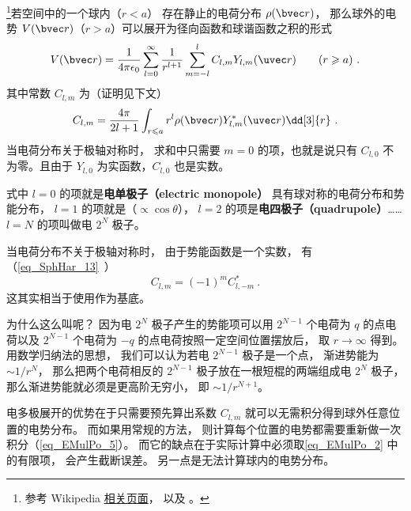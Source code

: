 

\footnote{参考 Wikipedia \href{https://en.wikipedia.org/wiki/Multipole_expansion}{相关页面}， 以及 \cite{Jackson}。}若空间中的一个球内（$r < a$） 存在静止的电荷分布 $\rho(\bvec r)$， 那么球外的电势 $V(\bvec r)$（$r > a$）可以展开为径向函数和球谐函数之积的形式
\begin{equation}\label{eq_EMulPo_2}
V(\bvec r) = \frac{1}{4\pi\epsilon_0}\sum_{l = 0}^\infty \frac{1}{r^{l+1}}\sum_{m = -l}^l C_{l,m} Y_{l,m}(\uvec r) \qquad (r \geqslant a)~.
\end{equation}
其中常数 $C_{l,m}$ 为（证明见下文）
\begin{equation}\label{eq_EMulPo_7}
C_{l,m} = \frac{4\pi}{2l+1} \int_{r\leqslant a} r^l \rho(\bvec r) Y_{l,m}^*(\uvec r) \dd[3]{r}~.
\end{equation}
当电荷分布关于极轴对称时， 求和中只需要 $m=0$ 的项，也就是说只有 $C_{l,0}$ 不为零。且由于 $Y_{l,0}$ 为实函数，$C_{l,0}$ 也是实数。

式中 $l = 0$ 的项就是\textbf{电单极子（electric monopole）} 具有球对称的电荷分布和势能分布， $l = 1$ 的项就是（$\propto\cos \theta$）， $l = 2$ 的项是\textbf{电四极子（quadrupole）}……  $l = N$ 的项叫做电 $2^N$ 极子。

当电荷分布不关于极轴对称时， 由于势能函数是一个实数， 有（\autoref{eq_SphHar_13}~）
\begin{equation}
C_{l,m} = (-1)^m C_{l,-m}^*~.
\end{equation}
这其实相当于使用作为基底。

为什么这么叫呢？ 因为电 $2^N$ 极子产生的势能项可以用 $2^{N-1}$ 个电荷为 $q$ 的点电荷以及 $2^{N-1}$ 个电荷为 $-q$ 的点电荷按照一定空间位置摆放后， 取 $r \to \infty$ 得到。 用数学归纳法的思想， 我们可以认为若电 $2^{N-1}$ 极子是一个点， 渐进势能为 $\sim 1/r^N$， 那么把两个电荷相反的 $2^{N-1}$ 极子放在一根短棍的两端组成电 $2^N$ 极子， 那么渐进势能就必须是更高阶无穷小， 即 $\sim 1/r^{N+1}$。

电多极展开的优势在于只需要预先算出系数 $C_{l,m}$ 就可以无需积分得到球外任意位置的电势分布。 而如果用常规的方法， 则计算每个位置的电势都需要重新做一次积分（\autoref{eq_EMulPo_5}）。 而它的缺点在于实际计算中必须取\autoref{eq_EMulPo_2} 中的有限项， 会产生截断误差。 另一点是无法计算球内的电势分布。

